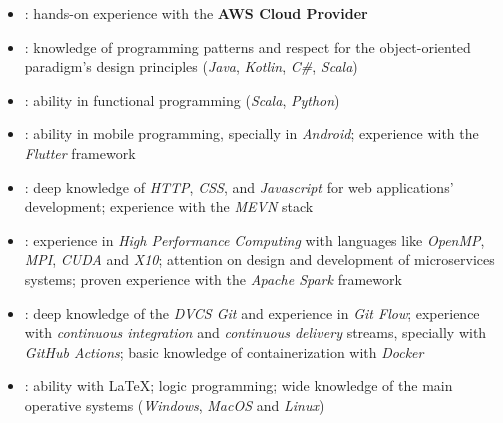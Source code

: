 \documentclass[letterpaper]{template-eng} %
\begin{document}
\begin{itemize}
    \item {}: hands-on experience with the \textbf{AWS Cloud Provider}
    \item {}: knowledge of programming patterns and respect for the object-oriented paradigm's design principles (\textit{Java}, \textit{Kotlin}, \textit{C\#}, \textit{Scala})
    \item {}: ability in functional programming (\textit{Scala}, \textit{Python})
    \item {}: ability in mobile programming, specially in \textit{Android}; experience with the \textit{Flutter} framework
    \item {}: deep knowledge of \textit{HTTP}, \textit{CSS}, and \textit{Javascript} for web applications' development; experience with the \textit{MEVN} stack
    \item {}: experience in \textit{High Performance Computing} with languages like \textit{OpenMP}, \textit{MPI}, \textit{CUDA} and \textit{X10}; attention on design and development of microservices systems; proven experience with the \textit{Apache Spark} framework
    \item {}: deep knowledge of the \textit{DVCS Git} and experience in \textit{Git Flow}; experience with \textit{continuous integration} and \textit{continuous delivery} streams, specially with \textit{GitHub Actions}; basic knowledge of containerization with \textit{Docker}
    \item {}: ability with \LaTeX; logic programming; wide knowledge of the main operative systems (\textit{Windows}, \textit{MacOS} and \textit{Linux})
\end{itemize}
\end{document}
